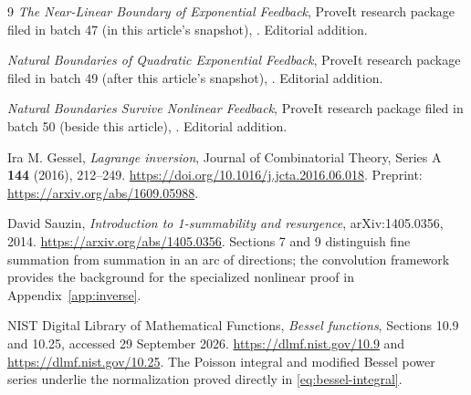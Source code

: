 \documentclass[11pt,a4paper]{article}
\numberwithin{equation}{section}
\theoremstyle{definition}
\theoremstyle{remark}
\theoremstyle{definition}
\begin{document}
\begin{thebibliography}{9}
\emph{The Near-Linear Boundary of Exponential Feedback}, ProveIt research
package filed in batch 47 (in this article's snapshot),
.
Editorial addition.

\emph{Natural Boundaries of Quadratic Exponential Feedback}, ProveIt research
package filed in batch 49 (after this article's snapshot),
.
Editorial addition.

\emph{Natural Boundaries Survive Nonlinear Feedback}, ProveIt research
package filed in batch 50 (beside this article),
.
Editorial addition.

Ira M. Gessel, \emph{Lagrange inversion}, Journal of Combinatorial Theory,
Series A \textbf{144} (2016), 212--249.
\url{https://doi.org/10.1016/j.jcta.2016.06.018}.
Preprint: \url{https://arxiv.org/abs/1609.05988}.

David Sauzin, \emph{Introduction to 1-summability and resurgence},
arXiv:1405.0356, 2014.
\url{https://arxiv.org/abs/1405.0356}.
Sections 7 and 9 distinguish fine summation from summation in an arc of
directions; the convolution framework provides the background for the
specialized nonlinear proof in Appendix~\ref{app:inverse}.

NIST Digital Library of Mathematical Functions,
\emph{Bessel functions}, Sections 10.9 and 10.25, accessed 29 September 2026.
\url{https://dlmf.nist.gov/10.9} and
\url{https://dlmf.nist.gov/10.25}.
The Poisson integral and modified Bessel power series underlie the
normalization proved directly in \eqref{eq:bessel-integral}.
\end{thebibliography}
\end{document}
